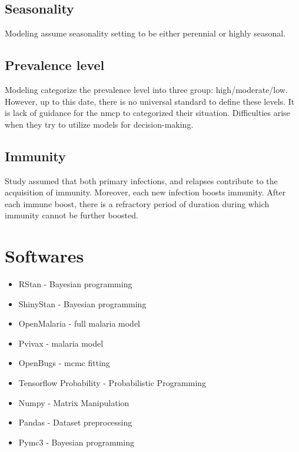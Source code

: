 \documentclass[a4paper, 12pt, twoside]{report}
\begin{document}
\subsection{Seasonality}%
\label{par:seasonality}
Modeling assume seasonality setting to be either perennial or highly seasonal.

\subsection{Prevalence level}
Modeling categorize the prevalence level into three group: high/moderate/low.
However, up to this date, there is no universal standard to define these levels.
It is lack of guidance for the \gls{nmcp} to categorized their situation.
Difficulties arise when they try to utilize models for decision-making.


\subsection{Immunity}%
\label{par:immunity}
Study\cite{White2018b} assumed that both primary infections, and relapses contribute to the acquisition of immunity.
Moreover, each new infection boosts immunity.
After each immune boost, there is a refractory period of duration during which immunity cannot be further boosted.


\section{Softwares}

\begin{itemize}
  \item RStan - Bayesian programming
	\item ShinyStan - Bayesian programming
	\item OpenMalaria - full malaria model
  \item Pvivax - malaria model %
	\item OpenBugs - \gls{mcmc} fitting \cite{Lunn2009}
	\item Tensorflow Probability - Probabilistic Programming
	\item Numpy - Matrix Manipulation
	\item Pandas - Dataset preprocessing
	\item Pymc3 - Bayesian programming
\end{itemize}
\end{document}
